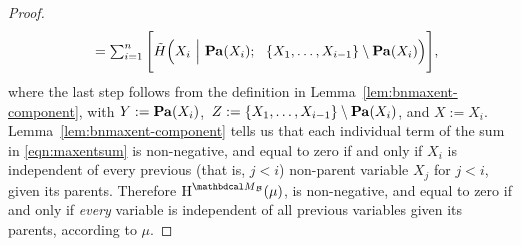 \begin{proof}
\begin{equation}
\begin{array}{lll}
		&= \sum_{i = 1}^n  \Bigg[ \tilde H\Big(X_i
					  ~\Big|~\mathbf{Pa}(X_i);~~\{X_1, \ldots, X_{i-1}\}
								\setminus \mathbf{Pa}(X_i)\Big) \Bigg],
			\end{array}
			\end{equation}
where the last step follows from the definition in
Lemma~\ref{lem:bnmaxent-component}, 
with $Y := \mathbf{Pa}(X_i)$,~$Z := \{X_1,
							\ldots, X_{i-1}\} \setminus \mathbf{Pa}(X_i)$,
							and $X := X_i$. 
	Lemma~\ref{lem:bnmaxent-component} tells us that each individual term of the sum in \eqref{eqn:maxentsum} is non-negative, and equal to zero if and only if $X_i$ is independent of every previous (that is, $j < i$) non-parent variable $X_j$ for $j < i$, given its parents. 	
	Therefore $\H^{\PDGof{\mathcal B}}(\mu)$, is non-negative, and equal to zero if and only if \emph{every} variable is independent of all previous variables given its parents, according to $\mu$. 
	
	

\end{proof}
